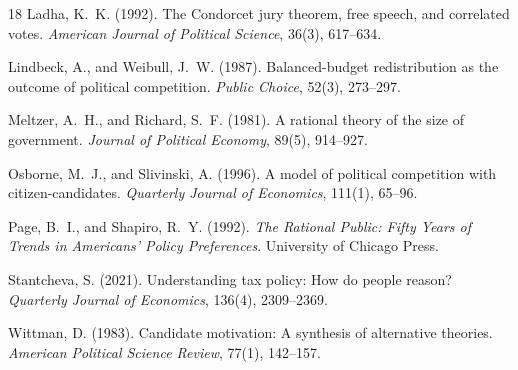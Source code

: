 \documentclass[11pt]{article}
\begin{document}
\begin{thebibliography}{18}
Ladha, K.~K. (1992). The Condorcet jury theorem, free speech, and
correlated votes. \emph{American Journal of Political Science}, 36(3),
617--634.

Lindbeck, A., and Weibull, J.~W. (1987). Balanced-budget redistribution as
the outcome of political competition. \emph{Public Choice}, 52(3),
273--297.

Meltzer, A.~H., and Richard, S.~F. (1981). A rational theory of the
size of government. \emph{Journal of Political Economy}, 89(5),
914--927.

Osborne, M.~J., and Slivinski, A. (1996). A model of political
competition with citizen-candidates. \emph{Quarterly Journal of
Economics}, 111(1), 65--96.

Page, B.~I., and Shapiro, R.~Y. (1992). \emph{The Rational Public: Fifty
Years of Trends in Americans' Policy Preferences}. University of Chicago
Press.

Stantcheva, S. (2021). Understanding tax policy: How do people reason?
\emph{Quarterly Journal of Economics}, 136(4), 2309--2369.

Wittman, D. (1983). Candidate motivation: A synthesis of alternative
theories. \emph{American Political Science Review}, 77(1), 142--157.

\end{thebibliography}
\end{document}
